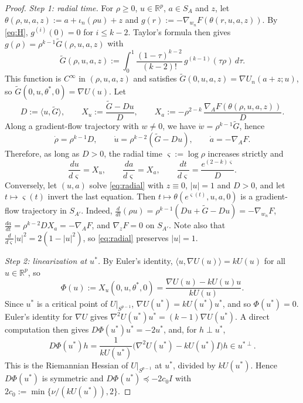 \documentclass[11pt]{article}
\theoremstyle{definition}
\theoremstyle{remark}
\numberwithin{equation}{section}
\newcommand{\R}{\mathbb{R}}
\newcommand{\ip}[2]{\langle #1,#2\rangle}
\begin{document}
\begin{proof}
\emph{Step 1: radial time.} For $\rho\ge0$, $u\in\R^p$, $a\in S_A$ and $z$, let $\theta(\rho,u,a,z):=a+\iota_n(\rho u)+z$ and $g(r):=-\nabla_{w_n}F(\theta(r,u,a,z))$. By \eqref{eq:H}, $g^{(i)}(0)=0$ for $i\le k-2$. Taylor's formula then gives $g(\rho)=\rho^{k-1}\tilde G(\rho,u,a,z)$ with
\[
\tilde G(\rho,u,a,z):=\int_0^1\frac{(1-\tau)^{k-2}}{(k-2)!}\,g^{(k-1)}(\tau\rho)\,d\tau .
\]
This function is $C^\infty$ in $(\rho,u,a,z)$ and satisfies $\tilde G(0,u,a,z)=\nabla U_n(a+z;u)$, so $\tilde G(0,u,\theta^*,0)=\nabla U(u)$. Let
\[
D:=\ip{u}{\tilde G},\qquad X_u:=\frac{\tilde G-Du}{D},\qquad X_a:=-\rho^{2-k}\,\frac{\nabla_AF(\theta(\rho,u,a,z))}{D}.
\]
Along a gradient-flow trajectory with $w\ne0$, we have $\dot w=\rho^{k-1}\tilde G$, hence
\[
\dot\rho=\rho^{k-1}D,\qquad \dot u=\rho^{k-2}(\tilde G-Du),\qquad \dot a=-\nabla_AF.
\]
Therefore, as long as $D>0$, the radial time $\varsigma:=\log\rho$ increases strictly and
\begin{equation}\label{eq:radial}
\frac{du}{d\varsigma}=X_u,\qquad\frac{da}{d\varsigma}=X_a,\qquad\frac{dt}{d\varsigma}=\frac{e^{(2-k)\varsigma}}{D}.
\end{equation}
Conversely, let $(u,a)$ solve \eqref{eq:radial} with $z\equiv0$, $|u|=1$ and $D>0$, and let $t\mapsto\varsigma(t)$ invert the last equation. Then $t\mapsto\theta(e^{\varsigma(t)},u,a,0)$ is a gradient-flow trajectory in $S_{A'}$. Indeed, $\frac{d}{dt}(\rho u)=\rho^{k-1}(Du+\tilde G-Du)=-\nabla_{w_n}F$, $\frac{da}{dt}=\rho^{k-2}DX_a=-\nabla_AF$, and $\nabla_zF=0$ on $S_{A'}$. Note also that $\frac{d}{d\varsigma}|u|^2=2(1-|u|^2)$, so \eqref{eq:radial} preserves $|u|=1$.

\emph{Step 2: linearization at $u^*$.} By Euler's identity, $\ip{u}{\nabla U(u)}=kU(u)$ for all $u\in\R^p$, so
\[
\Phi(u):=X_u(0,u,\theta^*,0)=\frac{\nabla U(u)-kU(u)u}{kU(u)} .
\]
Since $u^*$ is a critical point of $U|_{S^{p-1}}$, $\nabla U(u^*)=kU(u^*)u^*$, and so $\Phi(u^*)=0$. Euler's identity for $\nabla U$ gives $\nabla^2U(u^*)u^*=(k-1)\nabla U(u^*)$. A direct computation then gives $D\Phi(u^*)u^*=-2u^*$, and, for $h\perp u^*$,
\[
D\Phi(u^*)h=\frac{1}{kU(u^*)}\big(\nabla^2U(u^*)-kU(u^*)I\big)h\in u^{*\perp}.
\]
This is the Riemannian Hessian of $U|_{S^{p-1}}$ at $u^*$, divided by $kU(u^*)$. Hence $D\Phi(u^*)$ is symmetric and $D\Phi(u^*)\preceq-2c_0I$ with $2c_0:=\min\{\nu/(kU(u^*)),2\}$.


\end{proof}
\end{document}
